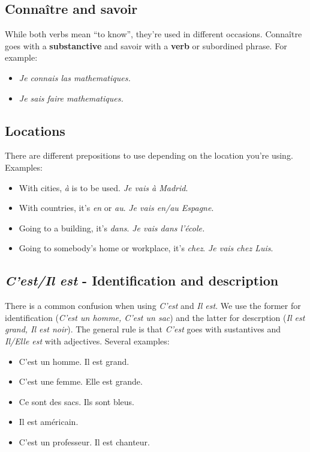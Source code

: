 \documentclass[palatino]{nicenotes}
\begin{document}
\subsection{Connaître and savoir}

While both verbs mean ``to know'', they're used in different occasions. Connaître goes with a \textbf{substanctive} and savoir with a \textbf{verb} or subordined phrase. For example:

\begin{itemize}
\item \textit{Je connais las mathematiques.}
\item \textit{Je sais faire mathematiques.}
\end{itemize}

\subsection{Locations}

There are different prepositions to use depending on the location you're using. Examples:

\begin{itemize}
\item With cities, \textit{à} is to be used. \textit{Je vais à Madrid}.
\item With countries, it's \textit{en} or \textit{au}. \textit{Je vais en/au Espagne}.
\item Going to a building, it's \textit{dans}. \textit{Je vais dans l'école.}
\item Going to somebody's home or workplace, it's \textit{chez}. \textit{Je vais chez Luis}.
\end{itemize}

\subsection{\textit{C'est/Il est} - Identification and description}

There is a common confusion when using \textit{C'est} and \textit{Il est}. We use the former for identification (\textit{C'est un homme, C'est un sac}) and the latter for descrption (\textit{Il est grand, Il est noir}). The general rule is that \textit{C'est} goes with sustantives and \textit{Il/Elle est} with adjectives. Several examples:


\begin{itemize}
\item C'est un homme. Il est grand.
\item C'est une femme. Elle est grande.
\item Ce sont des sacs. Ils sont bleus.
\item Il est américain.
\item C'est un professeur. Il est chanteur.
\end{itemize}
\end{document}
